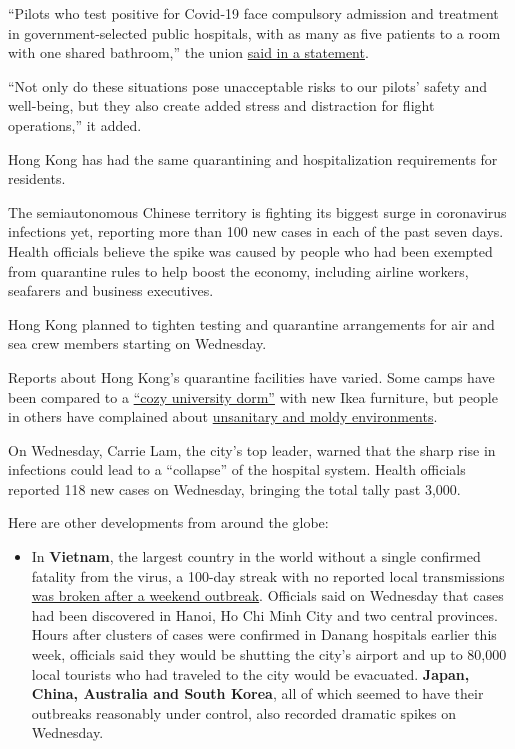 ``Pilots who test positive for Covid-19 face compulsory admission and
treatment in government-selected public hospitals, with as many as five
patients to a room with one shared bathroom,'' the union
\href{https://www.alpa.org/news-and-events/news-room/2020-07-28-fedex-pilots-face-unacceptable-conditions-in-hong-kong}{said
in a statement}.

``Not only do these situations pose unacceptable risks to our pilots'
safety and well-being, but they also create added stress and distraction
for flight operations,'' it added.

Hong Kong has had the same quarantining and hospitalization requirements
for residents.

The semiautonomous Chinese territory is fighting its biggest surge in
coronavirus infections yet, reporting more than 100 new cases in each of
the past seven days. Health officials believe the spike was caused by
people who had been exempted from quarantine rules to help boost the
economy, including airline workers, seafarers and business executives.

Hong Kong planned to tighten testing and quarantine arrangements for air
and sea crew members starting on Wednesday.

Reports about Hong Kong's quarantine facilities have varied. Some camps
have been compared to a
\href{https://edition.cnn.com/2020/04/09/homepage2/hong-kong-coronavirus-quarantine-diary-intl-hnk/index.html}{``cozy
university dorm''} with new Ikea furniture, but people in others have
complained about
\href{https://hongkongfp.com/2020/04/18/coronavirus-hong-kong-quarantine-arrivals-complain-of-disorderly-unsanitary-govt-facilities/}{unsanitary
and moldy environments}.

On Wednesday, Carrie Lam, the city's top leader, warned that the sharp
rise in infections could lead to a ``collapse'' of the hospital system.
Health officials reported 118 new cases on Wednesday, bringing the total
tally past 3,000.

Here are other developments from around the globe:

\begin{itemize}
\tightlist
\item
  In \textbf{Vietnam}, the largest country in the world without a single
  confirmed fatality from the virus, a 100-day streak with no reported
  local transmissions
  \href{https://www.nytimes.com/2020/07/29/world/asia/coronavirus-vietnam.html}{was
  broken after a weekend outbreak}. Officials said on Wednesday that
  cases had been discovered in Hanoi, Ho Chi Minh City and two central
  provinces. Hours after clusters of cases were confirmed in Danang
  hospitals earlier this week, officials said they would be shutting the
  city's airport and up to 80,000 local tourists who had traveled to the
  city would be evacuated. \textbf{Japan, China, Australia and South
  Korea}, all of which seemed to have their outbreaks reasonably under
  control, also recorded dramatic spikes on Wednesday.
\end{itemize}

